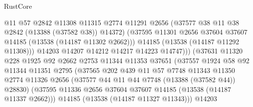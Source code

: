 \begin{lexlean}{RustCore}
\begin{coremodule}
                                  @11
                                  @57
                                  @2842
                                  @11308
                                  @11315
                                  @2774
                                  @11291
                                  @2656
                                  (@37577 @38 @11 @38 @2842 (@13388 (@37582 @38)) @14372)
                                  (@37595
                                    @11301
                                    @2656
                                    @37604
                                    @37607
                                    @14185
                                    (@13538 (@14187 @11302 @2662)))
                                  @14185
                                  (@13538 (@14187 @11292 @11308)))
                                @14203
                                @14207
                                @14212
                                @14217
                                @14223
                                @14747)))
                          (@37631
                            @11320
                            @228
                            @1925
                            @92
                            @2662
                            @2753
                            @11344
                            @11353
                            @37651
                            (@37557
                              @1924
                              @58
                              @92
                              @11344
                              @11351
                              @2795
                              (@37565
                                @202
                                @439
                                @11
                                @57
                                @7748
                                @11343
                                @11350
                                @2774
                                @11326
                                @2656
                                (@37577 @44 @11 @44 @7748 (@13388 (@37582 @44)) @28830)
                                (@37595
                                  @11336
                                  @2656
                                  @37604
                                  @37607
                                  @14185
                                  (@13538 (@14187 @11337 @2662)))
                                @14185
                                (@13538 (@14187 @11327 @11343)))
                              @14203

\end{coremodule}
\end{lexlean}
